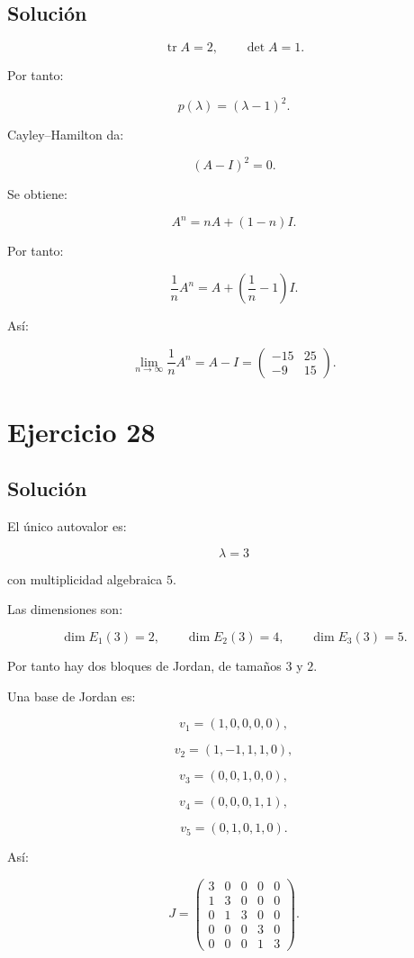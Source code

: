 \documentclass[11pt,a4paper]{article}
\newcommand{\tr}{\operatorname{tr}}
\begin{document}
\subsection{Solución}

\[
\tr A=2,
\qquad
\det A=1.
\]

Por tanto:

\[
p(\lambda)
=
(\lambda-1)^2.
\]

Cayley--Hamilton da:

\[
(A-I)^2=0.
\]

Se obtiene:

\[
A^n
=
nA+(1-n)I.
\]

Por tanto:

\[
\frac1nA^n
=
A+
\left(
\frac1n-1
\right)I.
\]

Así:

\[
\boxed{
\lim_{n\to\infty}\frac1nA^n
=
A-I
=
\begin{pmatrix}
-15&25\\
-9&15
\end{pmatrix}.
}
\]

\section{Ejercicio 28}
\subsection{Solución}

El único autovalor es:

\[
\lambda=3
\]

con multiplicidad algebraica $5$.

Las dimensiones son:

\[
\dim E_1(3)=2,
\qquad
\dim E_2(3)=4,
\qquad
\dim E_3(3)=5.
\]

Por tanto hay dos bloques de Jordan, de tamaños $3$ y $2$.

Una base de Jordan es:

\[
v_1=(1,0,0,0,0),
\]

\[
v_2=(1,-1,1,1,0),
\]

\[
v_3=(0,0,1,0,0),
\]

\[
v_4=(0,0,0,1,1),
\]

\[
v_5=(0,1,0,1,0).
\]

Así:

\[
\boxed{
J=
\begin{pmatrix}
3&0&0&0&0\\
1&3&0&0&0\\
0&1&3&0&0\\
0&0&0&3&0\\
0&0&0&1&3
\end{pmatrix}.
}
\]
\end{document}
